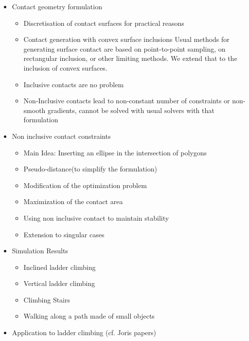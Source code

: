 \documentclass{article}
\begin{document}
\begin{itemize}
  \item Contact geometry formulation
    \begin{itemize}
      \item Discretisation of contact surfaces for practical reasons
      \item Contact generation with convex surface inclusions
Usual methods for generating surface contact are based on point-to-point sampling, on rectangular inclusion, or other limiting methods. We extend that to the inclusion of convex surfaces.
      \item Inclusive contacts are no problem
      \item Non-Inclusive contacts lead to non-constant number of constraints or non-smooth gradients, cannot be solved with usual solvers with that formulation
    \end{itemize}
  \item{Non inclusive contact constraints}
    \begin{itemize}
      \item {Main Idea: Inserting an ellipse in the intersection of polygons}
      \item {Pseudo-distance(to simplify the formulation)}
      \item {Modification of the optimization problem}
      \item {Maximization of the contact area}
      \item {Using non inclusive contact to maintain stability}
      \item {Extension to singular cases}
    \end{itemize}
  \item{Simulation Results}
    \begin{itemize}
      \item{Inclined ladder climbing}
      \item{Vertical ladder climbing}
      \item{Climbing Stairs}
      \item{Walking along a path made of small objects}
    \end{itemize}
  \item{Application to ladder climbing (cf. Joris papers)}
\end{itemize}
\end{document}
